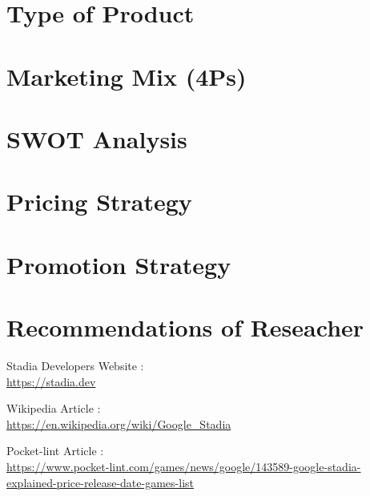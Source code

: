 \documentclass[a4paper,12pt]{article}
\newcommand{\link}[1]{{\color{blue}\href{#1}{#1}}}
\begin{document}
\section{Type of Product}

\newpage

\section{Marketing Mix (4Ps)}

\newpage

\section{SWOT Analysis}

\newpage

\section{Pricing Strategy}

\newpage

\section{Promotion Strategy}

\newpage

\section{Recommendations of Reseacher}


\newpage
{}
\begin{thebibliography}{9}

Stadia Developers Website : \\ \link{https://stadia.dev}

Wikipedia Article : \\ \link{https://en.wikipedia.org/wiki/Google\_Stadia}

Pocket-lint Article : \\ \link{https://www.pocket-lint.com/games/news/google/143589-google-stadia-explained-price-release-date-games-list}

\end{thebibliography}
\end{document}
